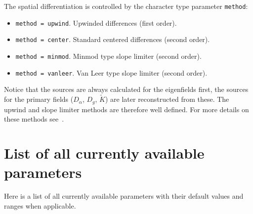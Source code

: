 \documentclass[12pt]{article}
\begin{document}
The spatial differentiation is controlled by the character type
parameter \texttt{method}:

\begin{itemize}

\item \texttt{method = upwind}. Upwinded differences (first order).

\item \texttt{method = center}. Standard centered differences (second order).

\item \texttt{method = minmod}. Minmod type slope limiter (second order).

\item \texttt{method = vanleer}. Van Leer type slope limiter (second order).

\end{itemize}

Notice that the sources are always calculated for the eigenfields
first, the sources for the primary fields ($D_\alpha$, $D_g$,
$\tilde{K}$) are later reconstructed from these.  The upwind and slope
limiter methods are therefore well defined.  For more details on these
methods see~\cite{Leveque92}.



\section{List of all currently available parameters}
\label{sec:parameters}

Here is a list of all currently available parameters with their
default values and ranges when applicable.
\end{document}
